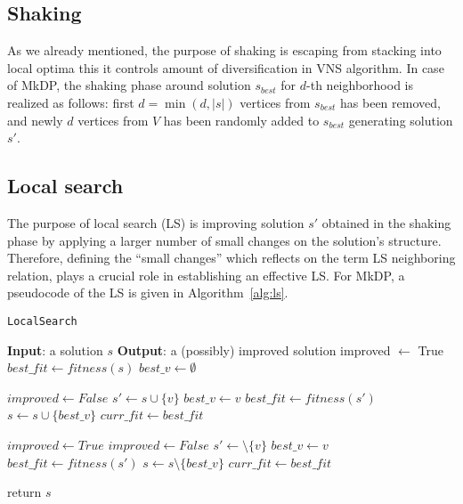 \documentclass[dvipsnames,format=sigconf,anonymous=true,review=true]{acmart}
\begin{document}
   \subsection{Shaking}
    As we already mentioned, the purpose of shaking is escaping from stacking into local optima this it controls amount of diversification in \textsc{VNS} algorithm.  In case of MkDP, the shaking phase   around solution $s_{best}$ for $d$-th neighborhood is realized as follows: first $d= \min(d, |s|)$ vertices from $s_{best}$ has been removed, and  newly $d$ vertices from $V $ has been randomly added to $s_{best}$ generating solution $s'$. 
    
    
   \subsection{Local search}\label{sec:local_search}
  The purpose of local search (LS) is improving  solution $s'$ obtained in the shaking phase by applying a larger number of small changes on  the solution's structure. Therefore, defining  the ``small changes'' which reflects on the term LS neighboring relation, plays a crucial role in establishing an effective LS.  For MkDP, a pseudocode of the LS is given in Algorithm~\ref{alg:ls}.
  
  
  \begin{algorithm}[!t] 
  	\caption{\texttt{LocalSearch}}\label{alg:ls}
  	\begin{algorithmic}[1]
  		\STATE \textbf{Input}: a solution $s$
  		\STATE \textbf{Output}: a (possibly) improved solution
  		\STATE improved $\gets$ True
  		\STATE $best\_fit \gets fitness(s)$
  		\STATE $best\_v \gets \emptyset$
 
  		     \STATE $improved \gets  False$
  		          \STATE $s' \gets s \cup \{v\}$
  		              \STATE $best\_v \gets v$
  		              \STATE $best\_fit \gets fitness(s')$
  		          \ENDIF
  		     \ENDFOR
  		         \STATE $s \gets s \cup \{best\_v\}$
  		         \STATE $curr\_fit \gets best\_fit$
  		     \ENDIF

  		\ENDWHILE   		    
  		 \STATE  $improved \gets True$
  		   \STATE $improved \gets  False$
  		       \STATE $s' \gets \setminus \{v\}$
  		             \STATE $best\_v \gets v$
  		             \STATE $best\_fit \gets fitness(s')$
  		       \ENDIF
  		       \STATE $s \gets s \setminus \{best\_v\}$
  		       \STATE $curr\_fit \gets best\_fit$
  		       \ENDIF
  		       
  		    \ENDFOR
  		\ENDWHILE
  		\STATE return $s$
  	\end{algorithmic}
\end{algorithm}
\end{document}
